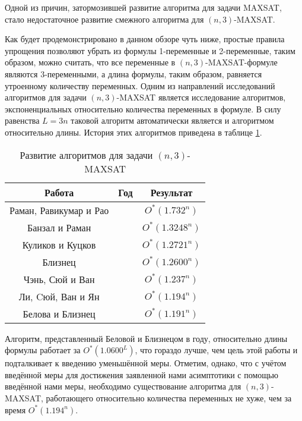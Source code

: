 Одной из причин, затормозившей развитие алгоритма для задачи MAXSAT, стало недостаточное развитие смежного алгоритма для $(n,3)$-MAXSAT.

Как будет продемонстрировано в данном обзоре чуть ниже, простые правила упрощения позволяют убрать из формулы 1-переменные и 2-переменные, таким образом, можно считать, что все переменные в $(n,3)$-MAXSAT-формуле являются 3-переменными, а длина формулы, таким образом, равняется утроенному количеству переменных. Одним из направлений исследований алгоритмов для задачи $(n,3)$-MAXSAT является исследование алгоритмов, экспоненциальных относительно количества переменных в формуле. В силу равенства $L = 3n$ таковой алгоритм автоматически является и алгоритмом относительно длины. История этих алгоритмов приведена в таблице \ref{table:n3-maxsat-research}.

\begin{table}[ht]
 \caption{Развитие алгоритмов для задачи $(n,3)$-MAXSAT}
 \centering
 \begin{tabular}{|c|c|c|}
  \hline
  \textbf{Работа} & \textbf{Год} & \textbf{Результат} \\
  \hline
  Раман, Равикумар и Рао \cite{raman1998simplified} & \citeyear{raman1998simplified} & $O^*(1.732^n)$ \\
  Банзал и Раман \cite{bansal99} & \citeyear{bansal99} & $O^*(1.3248^n)$ \\
  Куликов и Куцков \cite{kulikov2009new} & \citeyear{kulikov2009new} & $O^*(1.2721^n)$ \\
  Близнец \cite{bliznets2013new} & \citeyear{bliznets2013new} & $O^*(1.2600^n)$ \\
  Чэнь, Сюй и Ван \cite{chen15} & \citeyear{chen15} & $O^*(1.237^n)$ \\
  Ли, Cюй, Ван и Ян \cite{li2017improved} & \citeyear{li2017improved} & $O^*(1.194^n)$ \\
  Белова и Близнец \cite{belova18} & \citeyear{belova18} & $O^*(1.191^n)$ \\
  \hline
 \end{tabular}
 \label{table:n3-maxsat-research}
\end{table}

Алгоритм, представленный Беловой и Близнецом в \citeyear{belova18} году, относительно длины формулы работает за $O^*(1.0600^L)$, что гораздо лучше, чем цель этой работы и подталкивает к введению уменьшённой меры. Отметим, однако, что с учётом введённой меры для достижения заявленной нами асимптотики с помощью введённой нами меры, необходимо существование алгоритма для $(n,3)$-MAXSAT, работающего относительно количества переменных не хуже, чем за время $O^*(1.194^n)$.


